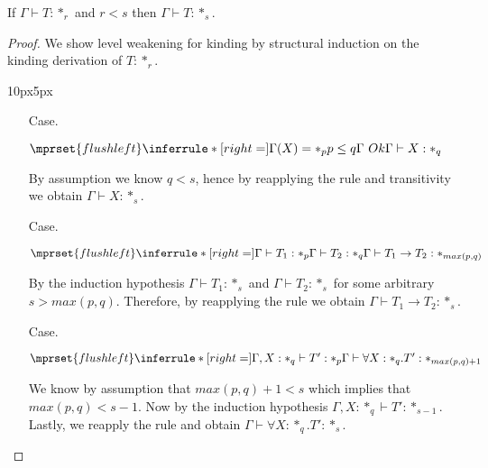 \begin{lemma}
  If $\Gamma \vdash T:*_r$ and $r < s$ then $\Gamma \vdash T:*_s$.
  \label{lemma:level_weakening_for_kinding_ssf}
\end{lemma}
\begin{proof}
  We show level weakening for kinding by structural induction on the kinding derivation 
  of $T:*_r$.
  \vspace{-25px}
  \begin{changemargin}{10px}{5px}\noindent
  \begin{itemize}
  \item[Case.]\ \\
    \begin{center}
      \begin{math}
        $$\mprset{flushleft}
        \inferrule* [right=] {
          \Gamma(X) = *_p
          \\
          p \leq q
          \\
          \Gamma\ Ok
        }{\Gamma \vdash X : *_q}
      \end{math}
    \end{center}
    By assumption we know $q < s$, hence by reapplying the rule and transitivity we 
    obtain $\Gamma \vdash X:*_s$.
    
  \item[Case.]\ \\
    \begin{center}
      \begin{math}
        $$\mprset{flushleft}
        \inferrule* [right=] {
          \Gamma \vdash T_1 : *_p
          \\
          \Gamma \vdash T_2 : *_q
        }{\Gamma \vdash T_1 \rightarrow T_2 : *_{max(p,q)}}
      \end{math}
    \end{center}
    By the induction hypothesis $\Gamma \vdash T_1 : *_s$ and 
    $\Gamma \vdash T_2 : *_s$ for some arbitrary $s > max(p,q)$.  Therefore, by 
    reapplying the rule we obtain $\Gamma \vdash T_1 \rightarrow T_2 : *_s$.
    
  \item[Case.]\ \\
    \begin{center}
      \begin{math}
        $$\mprset{flushleft}
        \inferrule* [right=] {
          \Gamma,X : *_q \vdash T' : *_p
        }{\Gamma \vdash \forall X:*_q.T' : *_{max(p,q)+1}}
      \end{math}
    \end{center}
    We know by assumption that $max(p,q) + 1 < s$ which implies that $max(p,q) < s - 1$.  
    Now by the induction hypothesis $\Gamma,X:*_q \vdash T':*_{s-1}$.  Lastly, we 
    reapply the rule and obtain $\Gamma \vdash \forall X:*_q.T' : *_{s}$.
  \end{itemize}
  \end{changemargin}
\end{proof}

